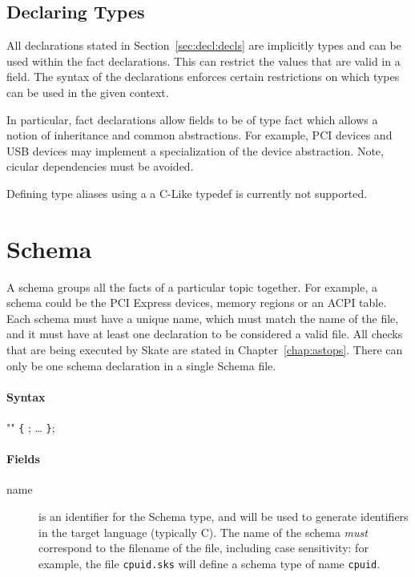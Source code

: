 \documentclass[a4paper,11pt,twoside]{report}
\begin{document}
{{\subsection{Declaring Types}
All declarations stated in Section~\ref{sec:decl:decls} are implicitly types 
and can be used within the fact declarations. This can restrict the values
that are valid in a field. The syntax of the declarations enforces certain
restrictions on which types can be used in the given context. 

In particular, fact declarations allow fields to be of type fact which allows 
a notion of inheritance and common abstractions. For example, PCI devices and
USB devices may implement a specialization of the device abstraction. Note, 
cicular dependencies must be avoided.

Defining type aliases using a a C-Like typedef is currently not supported.

\section{Schema}\label{sec:decl:schema}

A schema groups all the facts of a particular topic together. For example, 
a schema could be the PCI Express devices, memory regions or an ACPI table. 
Each schema must have a unique name, which must match the name of the file, and
it must have at least one declaration to be considered a valid file. All checks
that are being executed by Skate are stated in Chapter~\ref{chap:astops}.
There can only be one schema declaration in a single Schema file.

\paragraph{Syntax}

\begin{syntax}
  "" \verb+{+
  ;
  \ldots
\verb+}+;
\end{syntax}

\paragraph{Fields}

\begin{description}
\item[name] is an identifier for the Schema type, and will be used to
  generate identifiers in the target language (typically C).  
  The name of the schema \emph{must} correspond to the
  filename of the file, including case sensitivity: for example, 
  the file \texttt{cpuid.sks} will define a schema type
  of name \texttt{cpuid}. 


\end{description}}}
\end{document}
